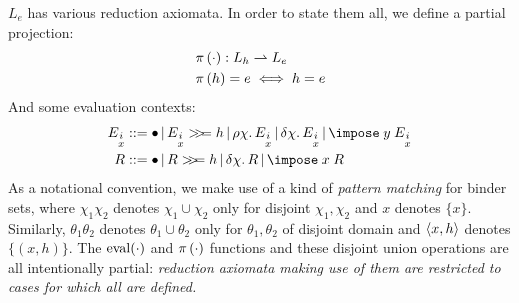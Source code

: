 \documentclass{report}
\begin{document}
\( L_e \) has various reduction axiomata.
In order to state them all, we define a partial projection:
\begin{align*}
  &\operatorname*{\pi} {\left(\cdot\right)} : L_h \rightharpoonup L_e \\
  &\operatorname*{\pi} {\left(h\right)} = e \iff h = e
\end{align*}
And some evaluation contexts:
\begin{align*}
  E_{\substack{i\\x}}
    &::= \hole
      \| E_{\substack{i\\x}} \bind h
      \| \rh \chi E_{\substack{i\\x}}
      \| \del \chi E_{\substack{i\\x}}
      \| \impose \app y \app E_{\substack{i\\x}}\\
  R &::= \hole
      \| R \bind h
      \| \del \chi R
      \| \impose \app x \app R
\end{align*}
As a notational convention, we make use of a kind of \emph{pattern matching} for binder sets, where \( \chi_1 \chi_2 \) denotes \( \chi_1 \cup \chi_2 \) only for disjoint \( \chi_1, \chi_2 \) and \( x \) denotes \( {\{x\}} \).
Similarly, \( \theta_1 \theta_2 \) denotes \( \theta_1 \cup \theta_2 \) only for \( \theta_1, \theta_2 \) of disjoint domain and \( {\left< x, h \right>} \) denotes \( \{(x, h)\} \).
The \( \operatorname*{\mathrm{eval}}(\cdot) \) and \( \operatorname*{\pi} {\left(\cdot\right)} \) functions and these disjoint union operations are all intentionally partial: \emph{reduction axiomata making use of them are restricted to cases for which all are defined.}
\end{document}
